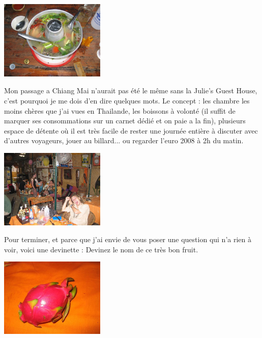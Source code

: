 \begin{multicols}{2}
\smallbreak
\hspace*{-0.65cm}
\includegraphics[width=5cm]{articles/Chiang-mai/1214286184dsFU.jpg}
\smallbreak

Mon passage a Chiang Mai n'aurait pas été le même sans la Julie's Guest House, c'est pourquoi je me dois d'en dire quelques mots. Le concept : les chambre les moins chères que j'ai vues en Thailande, les boissons à volonté (il suffit de marquer ses consommations sur un carnet dédié et on paie a la fin), plusieurs espace de détente où il est très facile de rester une journée entière à discuter avec d'autres voyageurs, jouer au billard... ou regarder l'euro 2008 à 2h du matin.

\smallbreak
\hspace*{-0.65cm}
\includegraphics[width=5cm]{articles/Chiang-mai/1214471834JD3r.jpg}
\smallbreak

Pour terminer, et parce que j'ai envie de vous poser une question qui n'a rien à voir, voici une devinette : Devinez le nom de ce très bon fruit.

\smallbreak
\hspace*{-0.65cm}
\includegraphics[width=5cm]{articles/Chiang-mai/1214471825EGhM.jpg}
\smallbreak

\end{multicols}


